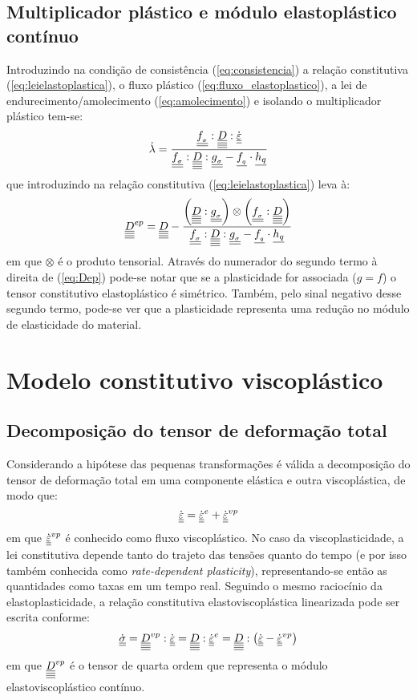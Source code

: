 \subsection{Multiplicador plástico e módulo elastoplástico contínuo}
Introduzindo na condição de consistência (\ref{eq:consistencia}) a relação constitutiva (\ref{eq:leielastoplastica}), o fluxo plástico (\ref{eq:fluxo_elastoplastico}), a lei de endurecimento/amolecimento (\ref{eq:amolecimento}) e isolando o multiplicador plástico tem-se:
\begin{equation}
	\label{eq:lambda}
	\dot \lambda = \dfrac{\underline{\underline {f_{_\sigma}}}:\underline{\underline{\underline{\underline D}}}:\dot {\underline{\underline \varepsilon}}}{\underline{\underline {f_{_\sigma}}}:\underline{\underline{\underline{\underline D}}}:\underline{\underline {g_{_\sigma}}}-\underline{f_{_q}} \cdot \underline{h_q}}
\end{equation}
que introduzindo na relação constitutiva (\ref{eq:leielastoplastica}) leva à:
\begin{equation}
	\label{eq:Dep}
	\underline{\underline{\underline{\underline D}}}^{ep} = \underline{\underline{\underline{\underline D}}} - \dfrac{\left(\underline{\underline{\underline{\underline D}}}:\underline{\underline {g_{_\sigma}}} \right)\otimes\left(\underline{\underline {f_{_\sigma}}}:\underline{\underline{\underline{\underline D}}} \right)}{\underline{\underline {f_{_\sigma}}}:\underline{\underline{\underline{\underline D}}}:\underline{\underline {g_{_\sigma}}}-\underline{f_{_q}} \cdot \underline{h_q}}
\end{equation}
em que $\otimes$ é o produto tensorial. Através do numerador do segundo termo à direita de (\ref{eq:Dep}) pode-se notar que se a plasticidade for associada ($g=f$) o tensor constitutivo elastoplástico é simétrico. Também, pelo sinal negativo desse segundo termo, pode-se ver que a plasticidade representa uma redução no módulo de elasticidade do material.

\section{Modelo constitutivo viscoplástico}

\subsection{Decomposição do tensor de deformação total}
Considerando a hipótese das pequenas transformações é válida a decomposição do tensor de deformação total em uma componente elástica e outra viscoplástica, de modo que:
\begin{equation}
	\label{eq:decomposicao_deformacoes_vp}
	\dot {\underline{\underline \varepsilon}} = \dot {\underline{\underline \varepsilon}}^e + \dot {\underline{\underline \varepsilon}}^{vp} 
\end{equation}
em que $\dot {\underline{\underline \varepsilon}}^{vp}$ é conhecido como fluxo viscoplástico. No caso da viscoplasticidade, a lei constitutiva depende tanto do trajeto das tensões quanto do tempo (e por isso também conhecida como \textit{rate-dependent plasticity}), representando-se então as quantidades como taxas em um tempo real. Seguindo o mesmo raciocínio da elastoplasticidade, a relação constitutiva elastoviscoplástica linearizada pode ser escrita conforme:
\begin{equation}
	\label{eq:leielastoviscoplastica}
	\dot {\underline{\underline \sigma}} = \underline{\underline{\underline{\underline D}}}^{vp}:\dot {\underline{\underline \varepsilon}} = \underline{\underline{\underline{\underline D}}}:\dot {\underline{\underline \varepsilon}}^e = \underline{\underline{\underline{\underline D}}}:\left(\dot {\underline{\underline \varepsilon}} - \dot {\underline{\underline \varepsilon}}^{vp} \right)
\end{equation}
em que $\underline{\underline{\underline{\underline D}}}^{vp}$ é o tensor de quarta ordem que representa o módulo elastoviscoplástico contínuo.

